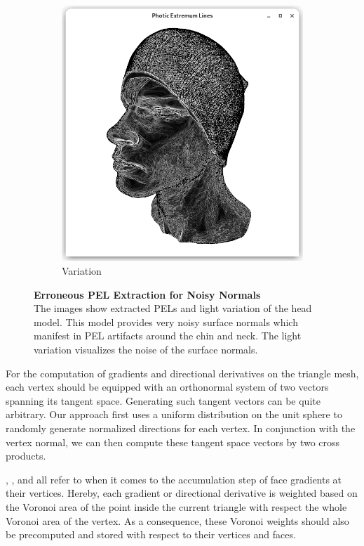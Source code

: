 \documentclass[9pt,fleqn,twoside,twocolumn]{stdglobal}
\begin{document}
\begin{figure}[h]
\begin{subfigure}[b]{0.49\linewidth}
        \includegraphics[width=\textwidth,trim={15px 15 15 50},clip]{images/head-light-variation.png}
        \caption{Variation}
      \end{subfigure}
      \caption{%
        \textbf{Erroneous PEL Extraction for Noisy Normals}\\
        The images show extracted PELs and light variation of the head model.
        This model provides very noisy surface normals which manifest in PEL artifacts around the chin and neck.
        The light variation visualizes the noise of the surface normals.
      }
      \label{fig:preprocessing-normals-noise}
    \end{figure}

    For the computation of gradients and directional derivatives on the triangle mesh, each vertex should be equipped with an orthonormal system of two vectors spanning its tangent space.
    Generating such tangent vectors can be quite arbitrary.
    Our approach first uses a uniform distribution on the unit sphere to randomly generate normalized directions for each vertex.
    In conjunction with the vertex normal, we can then compute these tangent space vectors by two cross products.

    \textcite{rusinkiewicz2004}, \textcite{xie2007}, and \textcite{zhang2010} all refer to \textcite{meyer2001} when it comes to the accumulation step of face gradients at their vertices.
    Hereby, each gradient or directional derivative is weighted based on the Voronoi area of the point inside the current triangle with respect the whole Voronoi area of the vertex.
    As a consequence, these Voronoi weights should also be precomputed and stored with respect to their vertices and faces.
\end{document}
